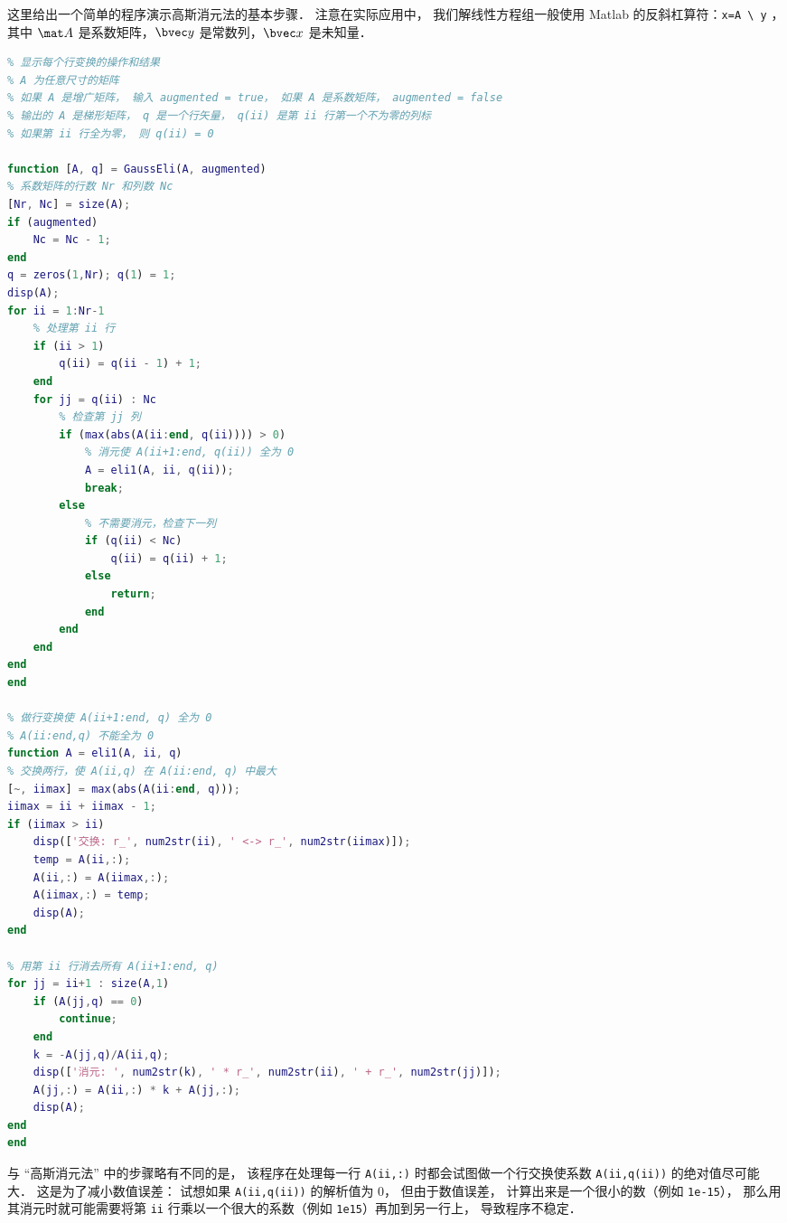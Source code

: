 

这里给出一个简单的程序演示高斯消元法的基本步骤． 注意在实际应用中， 我们解线性方程组一般使用 Matlab 的反斜杠算符：\verb|x=A \ y| ，其中 $\mat A$ 是系数矩阵，$\bvec y$ 是常数列，$\bvec x$ 是未知量．

\begin{lstlisting}[language=matlab, caption=GaussEli.m]
% 高斯消元法得到梯形系数矩阵
% 显示每个行变换的操作和结果
% A 为任意尺寸的矩阵
% 如果 A 是增广矩阵， 输入 augmented = true， 如果 A 是系数矩阵， augmented = false
% 输出的 A 是梯形矩阵， q 是一个行矢量， q(ii) 是第 ii 行第一个不为零的列标
% 如果第 ii 行全为零， 则 q(ii) = 0

function [A, q] = GaussEli(A, augmented)
% 系数矩阵的行数 Nr 和列数 Nc
[Nr, Nc] = size(A);
if (augmented)
    Nc = Nc - 1;
end
q = zeros(1,Nr); q(1) = 1;
disp(A);
for ii = 1:Nr-1
    % 处理第 ii 行
    if (ii > 1)
        q(ii) = q(ii - 1) + 1;
    end
    for jj = q(ii) : Nc
        % 检查第 jj 列
        if (max(abs(A(ii:end, q(ii)))) > 0)
            % 消元使 A(ii+1:end, q(ii)) 全为 0
            A = eli1(A, ii, q(ii));
            break;
        else
            % 不需要消元，检查下一列
            if (q(ii) < Nc)
                q(ii) = q(ii) + 1;
            else
                return;
            end
        end
    end
end
end

% 做行变换使 A(ii+1:end, q) 全为 0
% A(ii:end,q) 不能全为 0
function A = eli1(A, ii, q)
% 交换两行，使 A(ii,q) 在 A(ii:end, q) 中最大
[~, iimax] = max(abs(A(ii:end, q)));
iimax = ii + iimax - 1;
if (iimax > ii)
    disp(['交换: r_', num2str(ii), ' <-> r_', num2str(iimax)]);
    temp = A(ii,:);
    A(ii,:) = A(iimax,:);
    A(iimax,:) = temp;
    disp(A);
end

% 用第 ii 行消去所有 A(ii+1:end, q)
for jj = ii+1 : size(A,1)
    if (A(jj,q) == 0)
        continue;
    end
    k = -A(jj,q)/A(ii,q);
    disp(['消元: ', num2str(k), ' * r_', num2str(ii), ' + r_', num2str(jj)]);
    A(jj,:) = A(ii,:) * k + A(jj,:);
    disp(A);
end
end
\end{lstlisting}

与 “高斯消元法” 中的步骤略有不同的是， 该程序在处理每一行 \verb|A(ii,:)|  时都会试图做一个行交换使系数 \verb|A(ii,q(ii))| 的绝对值尽可能大． 这是为了减小数值误差： 试想如果 \verb|A(ii,q(ii))| 的解析值为 0， 但由于数值误差， 计算出来是一个很小的数（例如 \verb|1e-15|）， 那么用其消元时就可能需要将第 \verb|ii| 行乘以一个很大的系数（例如 \verb|1e15|）再加到另一行上， 导致程序不稳定．

